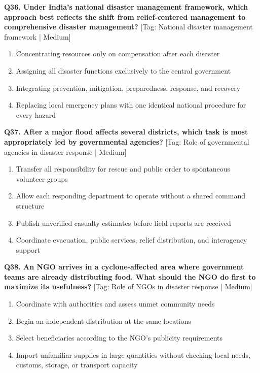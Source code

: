 \noindent\textbf{Q36. Under India's national disaster management framework, which approach best reflects the shift from relief-centered management to comprehensive disaster management?} \hfill [Tag: National disaster management framework | Medium]
\begin{enumerate}[label=(\alph*),topsep=2pt,itemsep=1pt,partopsep=0pt,parsep=0pt]
    \item {Concentrating resources only on compensation after each disaster}
    \item {Assigning all disaster functions exclusively to the central government}
    \item {Integrating prevention, mitigation, preparedness, response, and recovery}
    \item {Replacing local emergency plans with one identical national procedure for every hazard}
\end{enumerate}
\vspace{2mm}

\noindent\textbf{Q37. After a major flood affects several districts, which task is most appropriately led by governmental agencies?} \hfill [Tag: Role of governmental agencies in disaster response | Medium]
\begin{enumerate}[label=(\alph*),topsep=2pt,itemsep=1pt,partopsep=0pt,parsep=0pt]
    \item {Transfer all responsibility for rescue and public order to spontaneous volunteer groups}
    \item {Allow each responding department to operate without a shared command structure}
    \item {Publish unverified casualty estimates before field reports are received}
    \item {Coordinate evacuation, public services, relief distribution, and interagency support}
\end{enumerate}
\vspace{2mm}

\noindent\textbf{Q38. An NGO arrives in a cyclone-affected area where government teams are already distributing food. What should the NGO do first to maximize its usefulness?} \hfill [Tag: Role of NGOs in disaster response | Medium]
\begin{enumerate}[label=(\alph*),topsep=2pt,itemsep=1pt,partopsep=0pt,parsep=0pt]
    \item {Coordinate with authorities and assess unmet community needs}
    \item {Begin an independent distribution at the same locations}
    \item {Select beneficiaries according to the NGO's publicity requirements}
    \item {Import unfamiliar supplies in large quantities without checking local needs, customs, storage, or transport capacity}
\end{enumerate}
\vspace{2mm}

